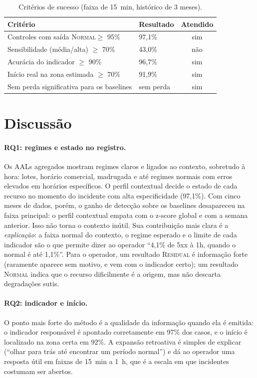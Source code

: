 \documentclass[sigconf,nonacm]{acmart}
\newcommand{\Normal}{\textsc{Normal}\xspace}
\newcommand{\Residual}{\textsc{Residual}\xspace}
\begin{document}
\begin{table}[t]
  \caption{Critérios de sucesso (faixa de 15~min, histórico de 3 meses).}
  \label{tab:criterios}
  \small
  \begin{tabular}{p{}p{}c}
    \toprule
    Critério & Resultado & Atendido \\
    \midrule
    Controles com saída \Normal $\geq$ 95\% & 97,1\% & sim \\
    Sensibilidade (média/alta) $\geq$ 70\% & 43,0\% & não \\
    Acurácia do indicador $\geq$ 90\% & 96,7\% & sim \\
    Início real na zona estimada $\geq$ 70\% & 91,9\% & sim \\
    Sem perda significativa para os baselines & sem perda & sim \\
    \bottomrule
  \end{tabular}
\end{table}

\section{Discussão}\label{sec:discussao}

\paragraph{RQ1: regimes e estado no registro.} Os AALs agregados mostram regimes claros e ligados ao contexto, sobretudo à hora: lotes, horário comercial, madrugada e até regimes normais com erros elevados em horários específicos. O perfil contextual decide o estado de cada recurso no momento do incidente com alta especificidade (97,1\%). Com cinco meses de dados, porém, o ganho de detecção sobre os baselines desapareceu na faixa principal: o perfil contextual empata com o z-score global e com a semana anterior. Isso não torna o contexto inútil. Sua contribuição mais clara é a \emph{explicação}: a faixa normal do contexto, o regime esperado e o limite de cada indicador são o que permite dizer ao operador ``4,1\% de 5xx à 1h, quando o normal é até 1,1\%''. Para o operador, um resultado \Residual é informação forte (raramente aparece sem motivo, e vem com o indicador certo); um resultado \Normal indica que o recurso dificilmente é a origem, mas não descarta degradações sutis.

\paragraph{RQ2: indicador e início.} O ponto mais forte do método é a qualidade da informação quando ela é emitida: o indicador responsável é apontado corretamente em 97\% dos casos, e o início é localizado na zona certa em 92\%. A expansão retroativa é simples de explicar (``olhar para trás até encontrar um período normal'') e dá ao operador uma resposta útil em faixas de 15~min a 1~h, que é a escala em que incidentes costumam ser abertos.
\end{document}
